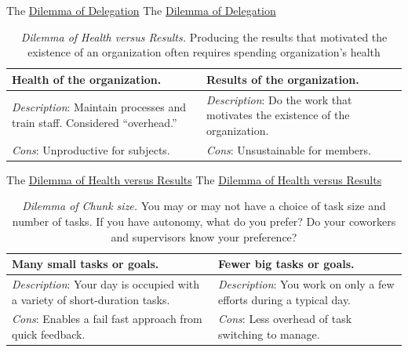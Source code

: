 The \href{table:delegate-or-not}{Dilemma of Delegation}
The \href{table:delegate-or-not}{Dilemma of Delegation}


\begin{center}
\begin{table}[H] %
\begin{tabular}{ | m{\dilemmatablewidth}| m{\dilemmatablewidth} | } 
  \hline
  \textbf{Health of the organization.} & 
  \textbf{Results of the organization.} \\ 
  \hline
  \textit{Description}: Maintain processes and train staff. Considered ``overhead.'' & 
  \textit{Description}: Do the work that motivates the existence of the organization. \\  
    \hline
  \textit{Cons}: Unproductive for subjects. & 
  \textit{Cons}: Unsustainable for members. \\
  \hline
\end{tabular}
\caption{
\textit{Dilemma of Health versus Results.}
 Producing the results that motivated the existence of an organization often requires spending organization's health
}
\label{table:health-vs-results}
\end{table}
\end{center}

The \href{table:health-vs-results}{Dilemma of Health versus Results}
The \href{table:health-vs-results}{Dilemma of Health versus Results}

\begin{center}
\begin{table}[H] %
\begin{tabular}{ | m{\dilemmatablewidth}| m{\dilemmatablewidth} | } 
  \hline
  \textbf{Many small tasks or goals.} & 
  \textbf{Fewer big tasks or goals.} \\ 
  \hline
  \textit{Description}: Your day is occupied with a variety of short-duration tasks. & 
  \textit{Description}: You work on only a few efforts during a typical day. \\  
    \hline
  \textit{Cons}: Enables a fail fast approach from quick feedback. & 
  \textit{Cons}: Less overhead of task switching to manage. \\
  \hline
\end{tabular}
\caption{
\textit{Dilemma of Chunk size.}
You may or may not have a choice of task size and number of tasks. If you have autonomy, what do you prefer? Do your coworkers and supervisors know your preference? 
}
\label{table:chunk-size}
\end{table}
\end{center}


